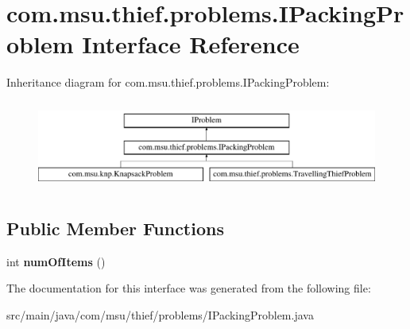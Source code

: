 \hypertarget{interfacecom_1_1msu_1_1thief_1_1problems_1_1IPackingProblem}{\section{com.\-msu.\-thief.\-problems.\-I\-Packing\-Problem Interface Reference}
\label{interfacecom_1_1msu_1_1thief_1_1problems_1_1IPackingProblem}
}
Inheritance diagram for com.\-msu.\-thief.\-problems.\-I\-Packing\-Problem\-:\begin{figure}[H]
\begin{center}
\leavevmode
\includegraphics[height=2.937063cm]{interfacecom_1_1msu_1_1thief_1_1problems_1_1IPackingProblem}
\end{center}
\end{figure}
\subsection*{Public Member Functions}
\begin{DoxyCompactItemize}
\item 
\hypertarget{interfacecom_1_1msu_1_1thief_1_1problems_1_1IPackingProblem_ab5d3f9128f77797d660f9372e7459297}{int {\bfseries num\-Of\-Items} ()}\label{interfacecom_1_1msu_1_1thief_1_1problems_1_1IPackingProblem_ab5d3f9128f77797d660f9372e7459297}

\end{DoxyCompactItemize}


The documentation for this interface was generated from the following file\-:\begin{DoxyCompactItemize}
\item 
src/main/java/com/msu/thief/problems/I\-Packing\-Problem.\-java\end{DoxyCompactItemize}
